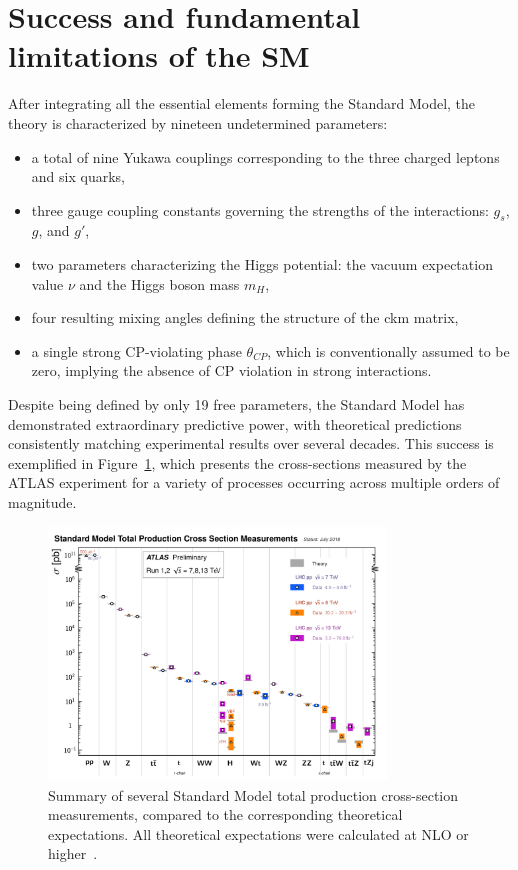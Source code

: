 \section{Success and fundamental limitations of the SM}
\label{sec:BSM}
After integrating all the essential elements forming the Standard Model, the theory is characterized by nineteen undetermined parameters:
\begin{itemize}
  \item a total of nine Yukawa couplings corresponding to the three charged leptons and six quarks,
  \item three gauge coupling constants governing the strengths of the interactions: \( g_s \), \( g \), and \( g' \),
  \item two parameters characterizing the Higgs potential: the vacuum expectation value \(\nu\) and the Higgs boson mass \(m_H\),
  \item four resulting mixing angles defining the structure of the \acrshort{ckm} matrix,
  \item a single strong CP-violating phase \(\theta_{CP}\), which is conventionally assumed to be zero, implying the absence of CP violation in strong interactions.
\end{itemize}
Despite being defined by only 19 free parameters, the Standard Model has demonstrated extraordinary predictive power, with theoretical predictions consistently matching experimental results over several decades. This success is exemplified in Figure~\ref{fig:totalxsect}, which presents the cross-sections measured by the ATLAS experiment for a variety of processes occurring across multiple orders of magnitude.
\begin{figure}[htbp]
  \centering
  \includegraphics[width=0.8\textwidth]{images/totalxsect.pdf}
  \caption{Summary of several Standard Model total production cross-section measurements, compared to the corresponding theoretical expectations. All theoretical expectations were calculated at NLO or higher~\cite{PlotsXsect}.}
  \label{fig:totalxsect}
\end{figure}


